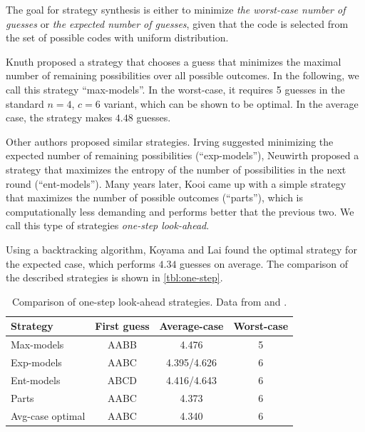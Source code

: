 The goal for strategy synthesis is either to minimize
  \emph{the worst-case number of guesses}
  or \emph{the expected number of guesses}, given that the code
  is selected from the set of possible codes with uniform distribution.

Knuth\cite{mm-knuth} proposed a strategy that chooses a guess
  that minimizes the maximal number of remaining possibilities over all
  possible outcomes.
In the following, we call this strategy ``max-models''.
In the worst-case, it requires 5 guesses in the standard $n=4$, $c=6$ variant,
  which can be shown to be optimal.
In the average case, the strategy makes $4.48$ guesses.

Other authors proposed similar strategies.
Irving\cite{mm-expnum} suggested minimizing the expected number
  of remaining possibilities (``exp-models''),
Neuwirth\cite{mm-entropy} proposed a strategy that maximizes
  the entropy of the number
  of possibilities in the next round (``ent-models'').
Many years later, Kooi\cite{mm-mostparts} came up with a simple strategy that
  maximizes the number of possible outcomes (``parts''),
  which is computationally less demanding and performs better that the previous two.
We call this type of strategies \emph{one-step look-ahead}.

Using a backtracking algorithm, Koyama and Lai\cite{mm-exp-opt} found
  the optimal strategy for the expected case, which performs $4.34$
  guesses on average.
The comparison of the described strategies is shown in \autoref{tbl:one-step}.

\begin{table}[ht]
\begin{center}
\begin{tabular}{|l|c|c|c|}
\hline Strategy & First guess & Average-case & Worst-case \\ \hline
Max-models & AABB & 4.476 & 5 \\ \hline
Exp-models & AABC & 4.395/4.626\footnotemark & 6 \\ \hline
Ent-models & ABCD & 4.416/4.643\footnotemark & 6 \\ \hline
Parts & AABC & 4.373 & 6 \\ \hline
Avg-case optimal & AABC & 4.340 & 6 \\ \hline
\end{tabular}
\caption{Comparison of one-step look-ahead strategies. Data from \cite{mm-ville} and \cite{mm-mostparts}.}
\label{tbl:one-step}
\end{center}
\end{table}
\addtocounter{footnote}{-1}

